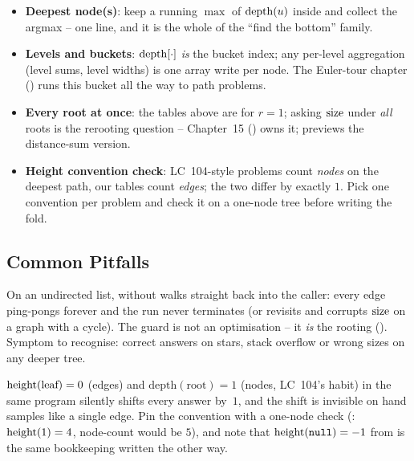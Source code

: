 \begin{itemize}[nosep]
  \item \textbf{Deepest node(s)}: keep a running $\max$ of $\operatorname{depth}(u)$ inside
         and collect the argmax -- one line, and it is the whole of the
        ``find the bottom'' family. \hfill{}
  \item \textbf{Levels and buckets}: $\operatorname{depth}[\cdot]$ \emph{is} the bucket index; any
        per-level aggregation (level sums, level widths) is one array write per node. The
        Euler-tour chapter () runs this bucket all the way to path problems.
        \hfill{}
  \item \textbf{Every root at once}: the tables above are for $r=1$; asking $\operatorname{size}$ under
        \emph{all} roots is the rerooting question -- Chapter~15 () owns it;
         previews the distance-sum version. \hfill{}
  \item \textbf{Height convention check}: LC~104-style problems count \emph{nodes} on the
        deepest path, our tables count \emph{edges}; the two differ by exactly $1$. Pick
        one convention per problem and check it on a one-node tree before writing the
        fold. \hfill{}
\end{itemize}

\subsection{Common Pitfalls}

\begin{warningbox}
On an undirected list,  without
 walks straight back into the caller: every edge ping-pongs forever
and the run never terminates (or revisits and corrupts $\operatorname{size}$ on a graph with a cycle).
The guard is not an optimisation -- it \emph{is} the rooting ().
Symptom to recognise: correct answers on stars, stack overflow or wrong sizes on any
deeper tree.
\end{warningbox}

\begin{warningbox}
$\operatorname{height}(\text{leaf})=0$ (edges) and $\text{depth}(\text{root})=1$ (nodes, LC~104's
habit) in the same program silently shifts every answer by~$1$, and the shift is
invisible on hand samples like a single edge. Pin the convention with a one-node check
(: $\operatorname{height}(1)=4$, node-count would be $5$), and note that
$\operatorname{height}(\texttt{null})=-1$ from  is the same bookkeeping written
the other way.
\end{warningbox}

